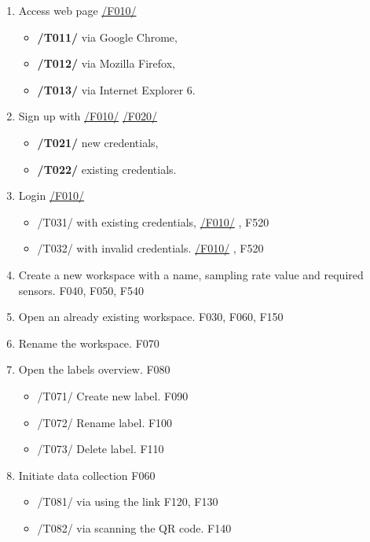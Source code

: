 \begin{enumerate}[{label = \textbf{/T{\protect\twodigits{\arabic{enumi}}}0/}, leftmargin = *}]
    \item Access web page \hyperref[welcome_page]{/F010/}
    \begin{itemize}
        \item \textbf{/T011/} via Google Chrome,
        \item \textbf{/T012/} via Mozilla Firefox,
        \item \textbf{/T013/} via Internet Explorer 6.
    \end{itemize}
    \item Sign up with \hyperref[welcome_page]{/F010/} \hyperref[registration_panel]{/F020/}
    \begin{itemize}
        \item \textbf{/T021/} new credentials,
        \item \textbf{/T022/} existing credentials.
    \end{itemize}
    \item Login \hyperref[welcome_page]{/F010/}
    \begin{itemize}
        \item /T031/ with existing credentials, \hyperref[welcome_page]{/F010/} , F520
        \item /T032/ with invalid credentials. \hyperref[welcome_page]{/F010/} , F520
    \end{itemize}
    \item Create a new workspace with a name, sampling rate value and required sensors. F040, F050, F540
    \item Open an already existing workspace. F030, F060, F150
    \item Rename the workspace. F070
    \item Open the labels overview. F080
    \begin{itemize}
        \item /T071/ Create new label. F090
        \item /T072/ Rename label. F100
        \item /T073/ Delete label. F110
    \end{itemize}
    \item Initiate data collection F060
    \begin{itemize}
        \item /T081/ via using the link F120, F130
        \item /T082/ via scanning the QR code. F140

\end{itemize}
\end{enumerate}
